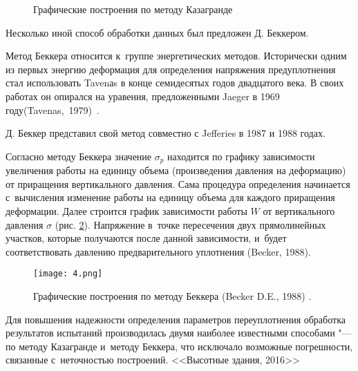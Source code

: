  \begin{figure}[h]
  \centering
  \small

  
  \caption{Графические построения по методу Казагранде}
  \label{eq:caz}
\end{figure}


Несколько иной способ обработки данных был предложен Д. Беккером. 

Метод Беккера относится к~группе энергетических методов.
Исторически одним из первых энергию деформация для определения напряжения предуплотнения стал использовать Tavenаs в конце семидесятых годов двадцатого века. В своих работах он опирался на уравения, предложенными Jaeger в 1969 году(Tavenas,~1979)~\cite{tavenas1979}.

Д. Беккер представил свой метод совместно с Jefferies в 1987 и 1988 годах.

Согласно методу Беккера значение $\sigma_p$ находится по графику зависимости увеличения работы на единицу объема (произведения давления на деформацию) от приращения вертикального давления. 
Сама процедура определения начинается с~вычисления изменение работы на единицу объема для каждого приращения деформации. 
Далее строится график зависимости работы $W$ от вертикального давления $\sigma$ (рис. \ref{eq:beck}). 
Напряжение в~точке пересечения двух прямолинейных участков, 
которые получаются после данной зависимости, 
и~будет соответствовать давлению предварительного уплотнения (Becker, 1988)\cite{becker1988}.

\begin{figure}[ht]
  \centering
  \small
  \label{eq:beck}
  \texttt{[image: 4.png]}
  \caption{Графические построения по методу Беккера (Becker D.E., 1988) \cite{becker1988}.}
\end{figure}


Для повышения надежности определения параметров переуплотнения обработка результатов испытаний производилась двумя наиболее известными способами "--- по методу Казагранде и~методу Беккера, что исключало возможные погрешности, связанные с~неточностью построений. <<Высотные здания, 2016>>
